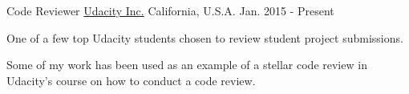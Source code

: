 \begin{cventries}
  \cventry
    {Code Reviewer}
    {\href{https://www.udacity.com/}{Udacity Inc.}}
    {California, U.S.A.}
    {Jan. 2015 - Present}
    {
      \begin{cvitems}
        \item {One of a few top Udacity students chosen to review student project submissions.}
        \item {Some of my work has been used as an example of a stellar code review in Udacity's course on how to conduct a code review.}
      \end{cvitems}
    }
\end{cventries}


